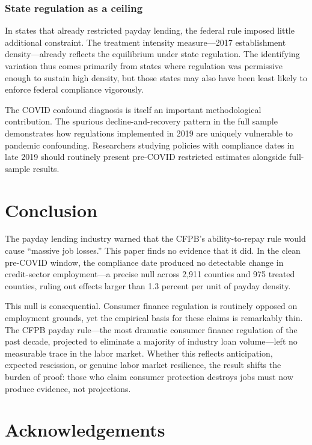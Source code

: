 \documentclass[12pt]{article}
\begin{document}
\subsubsection*{State regulation as a ceiling} In states that already restricted payday lending, the federal rule imposed little additional constraint. The treatment intensity measure---2017 establishment density---already reflects the equilibrium under state regulation. The identifying variation thus comes primarily from states where regulation was permissive enough to sustain high density, but those states may also have been least likely to enforce federal compliance vigorously.

The COVID confound diagnosis is itself an important methodological contribution. The spurious decline-and-recovery pattern in the full sample demonstrates how regulations implemented in 2019 are uniquely vulnerable to pandemic confounding. Researchers studying policies with compliance dates in late 2019 should routinely present pre-COVID restricted estimates alongside full-sample results.


\section{Conclusion}

The payday lending industry warned that the CFPB's ability-to-repay rule would cause ``massive job losses.'' This paper finds no evidence that it did. In the clean pre-COVID window, the compliance date produced no detectable change in credit-sector employment---a precise null across 2,911 counties and 975 treated counties, ruling out effects larger than 1.3 percent per unit of payday density.

This null is consequential. Consumer finance regulation is routinely opposed on employment grounds, yet the empirical basis for these claims is remarkably thin. The CFPB payday rule---the most dramatic consumer finance regulation of the past decade, projected to eliminate a majority of industry loan volume---left no measurable trace in the labor market. Whether this reflects anticipation, expected rescission, or genuine labor market resilience, the result shifts the burden of proof: those who claim consumer protection destroys jobs must now produce evidence, not projections.


\section*{Acknowledgements}
\end{document}
